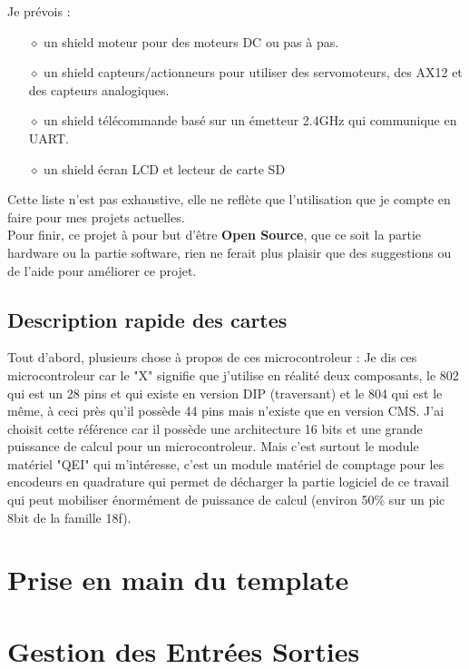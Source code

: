 \documentclass[a4paper]{article}
\begin{document}
 Je prévois :
 \begin{itemize}
 	\item[$\diamond$] un shield moteur pour des moteurs DC ou pas à pas.
 	\item[$\diamond$] un shield capteurs/actionneurs pour utiliser des servomoteurs, des AX12 et des capteurs analogiques.
 	\item[$\diamond$] un shield télécommande basé sur un émetteur 2.4GHz qui communique en UART.
 	\item[$\diamond$] un shield écran LCD et lecteur de carte SD
\end{itemize}
Cette liste n'est pas exhaustive, elle ne reflète que l'utilisation que je compte en faire pour mes projets actuelles.\\

Pour finir, ce projet à pour but d'être \textbf{Open Source}, que ce soit la partie hardware ou la partie software, rien ne ferait plus plaisir que des suggestions ou de l'aide pour améliorer ce projet.
 
 	\subsection{Description rapide des cartes}
 	
 Tout d'abord, plusieurs chose à propos de ces microcontroleur : Je dis ces microcontroleur car le "X" signifie que j'utilise en réalité deux composants, le 802 qui est un 28 pins et qui existe en version DIP (traversant) et le 804 qui est le même, à ceci près qu'il possède 44 pins mais n'existe que en version CMS. J'ai choisit cette référence car il possède une architecture 16 bits et une grande puissance de calcul pour un microcontroleur. Mais c'est surtout le module matériel "QEI" qui m'intéresse, c'est un module matériel de comptage pour les encodeurs en quadrature qui permet de décharger la partie logiciel de ce travail qui peut mobiliser énormément de puissance de calcul (environ 50\% sur un pic 8bit de la famille 18f).

\section{Prise en main du template}



\section{Gestion des Entrées Sorties}
\end{document}
